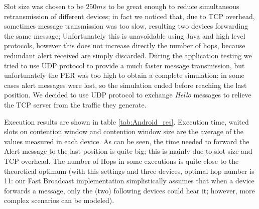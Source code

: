 Slot size was chosen to be $250ms$ to be great enough to reduce simultaneous retransmission of different devices; in fact we noticed that, due to TCP overhead, sometimes message transmission was too slow, resulting two devices forwarding the same message; Unfortunately this is unavoidable using Java and high level protocols, however this does not increase directly the number of hops, because redundant alert received are simply discarded.
During the application testing we tried to use UDP protocol to provide a much faster message transmission, but unfortunately the PER was too high to obtain a complete simulation: in some cases alert messages were lost, so the simulation ended before reaching the last position. We decided to use UDP protocol to exchange \textit{Hello} messages to relieve the TCP server from the traffic they generate.

Execution results are shown in table \ref{tab:Android_res}. Execution time, waited slots on contention window and contention window size are the average of the values measured in each device. As can be seen, the time needed to forward the Alert message to the last position is quite big; this is mainly due to slot size and TCP overhead. The number of Hops in some executions is quite close to the theoretical optimum (with this settings and three devices, optimal hop number is 11: our Fast Broadcast implementation simplistically assumes that when a device forwards a message, only the (two) following devices could hear it; however, more complex scenarios can be modeled).

